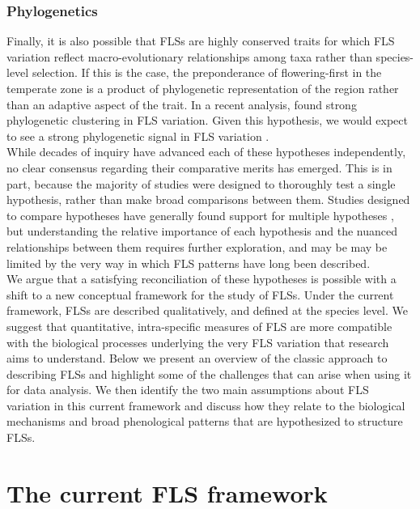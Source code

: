\documentclass{article}
\begin{document}
\subsubsection*{Phylogenetics} 
\noindent Finally, it is also possible that FLSs are highly conserved traits for which FLS variation reflect macro-evolutionary relationships among taxa rather than species-level selection. If this is the case, the preponderance of flowering-first in the temperate zone is a product of phylogenetic representation of the region rather than an adaptive aspect of the trait. In a recent analysis, \citet{Gougherty2018} found strong phylogenetic clustering in FLS variation. Given this hypothesis, we would expect to see a strong phylogenetic signal in FLS variation .\\

\noindent While decades of inquiry have advanced each of these hypotheses independently, no clear consensus regarding their comparative merits has emerged. This is in part, because the majority of studies were designed to thoroughly test a single hypothesis, rather than make broad comparisons between them. Studies designed to compare hypotheses have generally found support for multiple hypotheses \citep[see][]{Bolmgren2003,Gougherty2018}, but understanding the relative importance of each hypothesis and the nuanced relationships between them requires further exploration, and may be may be limited by the very way in which FLS patterns have long been described.\\

\noindent We argue that a satisfying reconciliation of these hypotheses is possible with a shift to a new conceptual framework for the study of FLSs. Under the current framework, FLSs are described qualitatively, and defined at the species level. We suggest that quantitative, intra-specific measures of FLS are more compatible with the biological processes underlying the very FLS variation that research aims to understand. Below we present an overview of the classic approach to describing FLSs and highlight some of the challenges that can arise when using it for data analysis. We then identify the two main assumptions about FLS variation in this current framework and discuss how they relate to the biological mechanisms and broad phenological patterns that are hypothesized to structure FLSs.\\

\section*{The current FLS framework}
\end{document}
